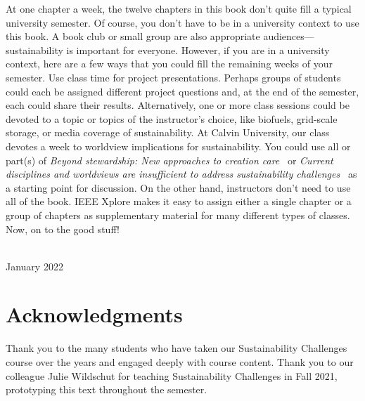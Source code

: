 {At one chapter a week, the twelve chapters in this book don't quite fill a typical 
university semester. 
Of course, you don't have to be in a university context to use this book. 
A book club or small group are also appropriate audiences---sustainability 
is important for everyone. 
However, if you are in a university context, here are a few ways that you could fill the 
remaining weeks of your semester. 
Use class time for project presentations. 
Perhaps groups of students could each be assigned different project questions and, 
at the end of the semester, each could share their results.
Alternatively, one or more class sessions could be devoted to a topic or topics 
of the instructor's choice, like biofuels, grid-scale storage, 
or media coverage of sustainability. 
At Calvin University, our class devotes a week to worldview implications for 
sustainability. 
You could use all or part(s) of \emph{Beyond stewardship: New approaches to 
creation care}~\citep{Warners:2019aa}
or \emph{Current disciplines and worldviews are insufficient
to address sustainability challenges}~\cite{VanH2019} as a starting point for discussion. 
On the other hand, instructors don't need to use all of the book. 
IEEE Xplore makes it easy to assign either a single chapter or a group of chapters 
as supplementary material for many different types of classes.
Now, on to the good stuff!

\vspace*{2pc}
\noindent\AUTHORS\\
\noindent January 2022
}

\cleardoublepage




\chapter*{Acknowledgments}

\thispagestyle{plain}

\noindent
Thank you to the many students who have taken our Sustainability Challenges course 
over the years and engaged deeply with course content.
Thank you to our colleague Julie Wildschut for teaching Sustainability Challenges in Fall 2021,
prototyping this text throughout the semester.

